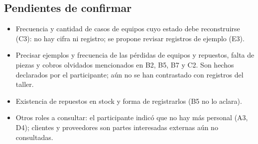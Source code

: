 \subsection*{Pendientes de confirmar}
\begin{itemize}[nosep]
  \item Frecuencia y cantidad de casos de equipos cuyo estado debe reconstruirse (C3): no hay
        cifra ni registro; se propone revisar registros de ejemplo (E3).
  \item Precisar ejemplos y frecuencia de las pérdidas de equipos y repuestos, falta de piezas
        y cobros olvidados mencionados en B2, B5, B7 y C2. Son hechos declarados por el
        participante; aún no se han contrastado con registros del taller.
  \item Existencia de repuestos en stock y forma de registrarlos (B5 no lo aclara).
  \item Otros roles a consultar: el participante indic\'o que no hay m\'as personal (A3, D4);
        clientes y proveedores son partes interesadas externas a\'un no consultadas.
\end{itemize}
